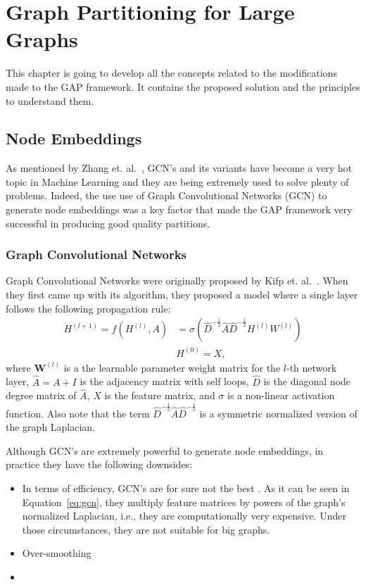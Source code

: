 %
%
\let\textcircled=\pgftextcircled
\chapter{Graph Partitioning for Large Graphs}
\label{Chapter3}
This chapter is going to develop all the concepts related to the modifications made to the GAP framework. It contains the proposed solution and the principles to understand them.

\section{Node Embeddings}
As mentioned by Zhang et. al.~\cite{gcnreview}, GCN's and its variants have become a very hot topic in Machine Learning and they are being extremely used to solve plenty of problems. Indeed, the use use of Graph Convolutional Networks (GCN) to generate node embeddings was a key factor that made the GAP framework very successful in producing good quality partitions.

\subsection{Graph Convolutional Networks}
Graph Convolutional Networks were originally proposed by Kifp et. al.~\cite{gcn}. When they first came up with its algorithm, they proposed a model where a single layer follows the following propagation rule:
\begin{align}
    \label{eq:gcn}
    H^{(l+1)} = f(H^{(l)}, A) &= \sigma\left(\hat{D}^{-\frac{1}{2}}\hat{A}\hat{D}^{-\frac{1}{2}}H^{(l)}W^{(l)}\right) \\
    & H^{(0)} = X,
\end{align}
where $\boldsymbol W^{(l)}$ is a the learnable parameter weight matrix for the $l$-th network layer, $\hat{A}=A+I$ is the adjacency matrix with self loops, $\hat{D}$ is the diagonal node degree matrix of $\hat{A}$, $X$ is the feature matrix, and $\sigma$ is a non-linear activation function. Also note that the term $\hat{D}^{-\frac{1}{2}}\hat{A}\hat{D}^{-\frac{1}{2}}$ is a symmetric normalized version of the graph Laplacian.

Although GCN's are extremely powerful to generate node embeddings, in practice they have the following downsides:
\begin{itemize}
    \item In terms of efficiency, GCN's are for sure not the best . As it can be seen in Equation~\ref{eq:gcn}, they multiply feature matrices by powers of the graph's normalized Laplacian, i.e., they are computationally very expensive. Under those circumstances, they are not suitable for big graphs.
    \item Over-smoothing
    \item 
\end{itemize}

